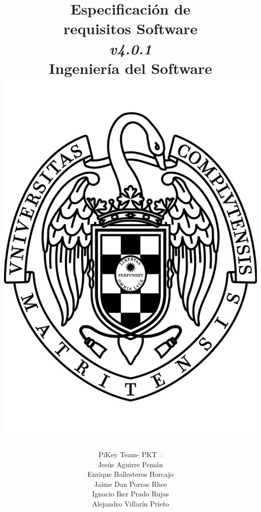 \documentclass[spanish,a4paper,11pt, twoside]{report}	%
\newcommand*{\PKT}{\hbox{P}\kern-2.5pt\lower3.5pt\hbox{\small{K}}\kern-2.8pt\hbox{T}\kern-2pt}	%
\begin{document}
\title{\textbf{\huge{Especificación de \\ 
	requisitos Software}} \\ 
	\textit{v4.0.1} \\	\vspace{0.1cm}
	\Large{Ingeniería del Software} \\
	\includegraphics[scale=0.3]{ucm.pdf}}
\author{{\Large{PiKey Team-}} \PKT \ : \vspace{0.2cm} \\
	Jesús Aguirre Pemán \\
	 Enrique Ballesteros Horcajo \\
	 Jaime Dan Porras Rhee \\
	 Ignacio Iker Prado Rujas \\
	 Alejandro Villarín Prieto }
\date{\Today}
\maketitle
\end{document}
